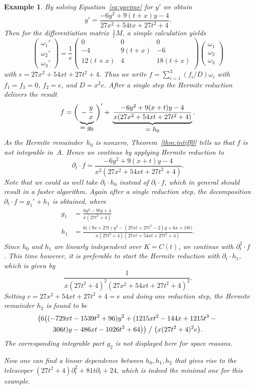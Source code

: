 \documentclass{sig-alternate}
\newtheorem{example}[theorem]{Example}
\begin{document}
\begin{example}
By solving Equation~\eqref{eq:yprime} for $y'$ we obtain
\[
  y' = \frac{-6y^2 + 9(t+x)y - 4}{27x^2+54tx+27t^2+4}.
\]
Then for the differentiation matrix~$\frac1eM$, a simple calculation yields
\[
  \begin{pmatrix} \omega_1' \\[1pt] \omega_2' \\[1pt] \omega_3' \end{pmatrix} =
  \frac{1}{e} \begin{pmatrix} 0 & 0 & 0 \\[1pt] -4 & 9 (t+x) & -6 \\[1pt] 12 (t+x) & 4 & 18 (t+x) \\ \end{pmatrix}
  \begin{pmatrix} \omega_1 \\[1pt] \omega_2 \\[1pt] \omega_3 \end{pmatrix}
\]
with $e=27x^2+54xt+27t^2+4$. Thus we write $f=\sum_{i=1}^3 (f_i/D) \omega_i$ with
$f_1=f_3=0$, $f_2=e$, and $D=x^2e$.  After a single step the Hermite reduction
delivers the result
\[
  f = \biggl(\, \underbrace{\vphantom{\frac{1}{(x)}} -\frac{y}{x}}_{\textstyle=g_0} \;\biggr)' +\>
  \underbrace{\frac{-6y^2+9(x+t)y-4}{x(27x^2+54xt+27t^2+4)}}_{\textstyle=h_0}.
\]
As the Hermite remainder~$h_0$ is nonzero, Theorem~\ref{thm:intiff0} tells us that
$f$ is not integrable in~$A$. Hence we continue by applying Hermite reduction to
\[
  \partial_t\cdot f = \frac{-6y^2+9(x+t)y-4}{x^2(27x^2+54xt+27t^2+4)}.
\]
Note that we could as well take $\partial_t\cdot h_0$ instead of $\partial_t\cdot f$, which
in general should result in a faster algorithm.
Again after a single reduction step, the decomposition $\partial_t\cdot f = g_1' + h_1$
is obtained, where
\begin{align*}
  g_1 &= \frac{6y^2-9ty+4}{x(27t^2+4)} \\
  h_1 &= \frac{6\bigl((9x+27t)y^2-(27xt+27t^2-2)y+6x+18t\bigr)}{x(27t^2+4)(27x^2+54xt+27t^2+4)}.
\end{align*}
Since $h_0$ and $h_1$ are linearly independent over $K=C(t)$, we continue with
$\partial_t^2\cdot f$.
This time however, it is preferable to start the Hermite reduction
with $\partial_t\cdot h_1$, which is given by
\[
  \frac{1}{x(27t^2+4)^2(27x^2+54xt+27t^2+4)^2}.
\]
Setting $v=27x^2+54xt+27t^2+4=e$ and doing one reduction step,
the Hermite remainder $h_2$ is found to be
\begin{multline*}
 \bigl(6\bigl((-729xt-1539t^2+96)y^2+(1215xt^2-144x+1215t^3-{}\\
 306t)y-486xt-1026t^2+64\bigr)\bigr)\mathrel{\big\slash}\bigl(x(27t^2+4)^2e\bigr).
\end{multline*}
The corresponding integrable part $g_2$ is not displayed here for space reasons.

Now one can find a linear dependence between $h_0,h_1,h_2$ that gives rise to the telescoper
$(27t^2+4)\partial_t^2+81t\partial_t+24$, which is indeed the minimal one for this example.
\end{example}
\end{document}
